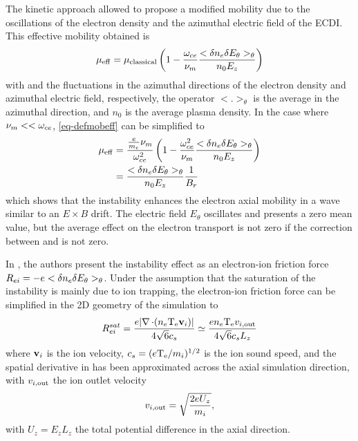   The kinetic approach allowed \citet{lafleur2016a} to propose a modified mobility due to the oscillations of the electron density and the azimuthal electric field of the \ac{ECDI}.
  This effective mobility obtained is 
  \begin{equation} \label{eq-defmobeff}
    \mu_{\mathrm{eff}} = \mu_{\mathrm{classical}} \left( 1 - \frac{\omega_{ce}}{\nu_m}  \frac{< \delta n_e \delta E_{\theta} >_{\theta} }{n_0 E_z}   \right)
  \end{equation}
  with \dne{} and \dEt{} the fluctuations in the azimuthal directions of the electron density and azimuthal electric field, respectively, the operator $< . >_{\theta}$ is the average in the azimuthal direction, and $n_0$ is the average plasma density.
  In the case where $\nu_m << \omega_{ce}$, \cref{eq-defmobeff} can be simplified to 
  \begin{align} 
    \mu_{\mathrm{eff}} &= \frac{\frac{e}{m_e} \nu_m}{\omega_{ce}^2} \left( 1 - \frac{\omega_{ce}^2}{\nu_m}  \frac{< \delta n_e \delta E_{\theta} >_{\theta} }{n_0 E_z}   \right) \nonumber \\
    &= \frac{< \delta n_e \delta E_{\theta} >_{\theta} }{n_0 E_z}   \frac{1}{B_r} \label{eq-mobeffsimple}
  \end{align}
  which shows that the instability enhances the electron axial mobility in a wave similar to an $E \times B$ drift.
  The electric field $E_{\theta}$ oscillates and presents a zero mean value, but the average effect on the electron transport is not zero if the correction between \dEt{} and \dne{} is not zero.
  
  In  \citet{lafleur2016a}, the authors present the instability effect as an electron-ion friction force $R_{ei} = - e < \delta n_e \delta E_{\theta} >_{\theta}$.
  Under the assumption that the saturation of the instability is mainly due to ion trapping, the electron-ion friction force can be simplified in the \ac{2D} geometry of the simulation to
  \begin{equation} \label{eq-rei-sat}
    R_{ei}^{sat} = \frac{e \lvert\operatorname{{\mathbf \nabla}} \cdot (n_e \mathrm{T_e} {\mathbf v_i})\rvert}{4 \sqrt{6} c_s} \simeq \frac{e n_e \mathrm{T_e}  v_{i, \rm out} }{4 \sqrt 6 c_s L_z}
  \end{equation} 
  where ${\mathbf v_i}$ is the ion velocity, $c_s=(e \mathrm{T_e}/m_i)^{1/2}$  is the ion sound speed, and the spatial derivative in has been approximated across the axial simulation direction, with $ v_{i, \rm out} $ the ion outlet velocity 
  \begin{equation} \label{eq-viz}
     v_{i, \rm out}  = \sqrt{\frac{2 e U_z}{m_i}},
  \end{equation}
  with $U_z = E_z L_z$ the total potential difference in the axial direction.
  
